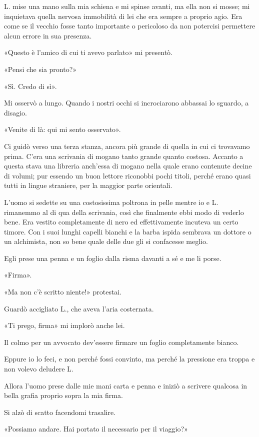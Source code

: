 \documentclass[a4paper,12pt]{book}
\begin{document}
L. mise una mano sulla mia schiena e mi spinse avanti, ma ella non si mosse; mi
inquietava quella nervosa immobilità di lei che era sempre a proprio agio. Era
come se il vecchio fosse tanto importante o pericoloso da non potercisi
permettere alcun errore in sua presenza.

«Questo è l'amico di cui ti avevo parlato» mi presentò.

«Pensi che sia pronto?»

«Sì. Credo di sì».

Mi osservò a lungo. Quando i nostri occhi si incrociarono abbassai lo sguardo,
a disagio.

«Venite di là: qui mi sento osservato».

Ci guidò verso una terza stanza, ancora più grande di quella in cui ci trovavamo
prima. C'era una scrivania di mogano tanto grande quanto costosa. Accanto a
questa stava una libreria anch'essa di mogano nella quale erano contenute decine
di volumi; pur essendo un buon lettore riconobbi pochi titoli, perché erano
quasi tutti in lingue straniere, per la maggior parte orientali.

L'uomo si sedette su una costosissima poltrona in pelle mentre io e L.
rimanemmo al di qua della scrivania, così che finalmente ebbi modo di vederlo
bene. Era vestito completamente di nero ed effettivamente incuteva un certo
timore. Con i suoi lunghi capelli bianchi e la barba ispida sembrava un dottore
o un alchimista, non so bene quale delle due gli si confacesse meglio.

Egli prese una penna e un foglio dalla risma davanti a sé e me li porse.

«Firma».

«Ma non c'è scritto niente!» protestai.

Guardò accigliato L., che aveva l'aria costernata.

«Ti prego, firma» mi implorò anche lei.

Il colmo per un avvocato dev'essere firmare un foglio completamente bianco.

Eppure io lo feci, e non perché fossi convinto, ma perché la pressione era
troppa e non volevo deludere L.

Allora l'uomo prese dalle mie mani carta e penna e iniziò a scrivere qualcosa in
bella grafia proprio sopra la mia firma.

Si alzò di scatto facendomi trasalire.

«Possiamo andare. Hai portato il necessario per il viaggio?»
\end{document}
